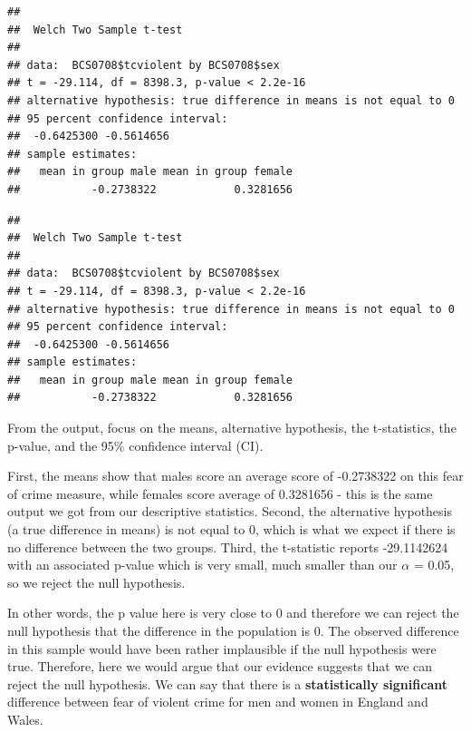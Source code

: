 \documentclass[
]{book}
\newenvironment{Shaded}{\begin{snugshade}}{\end{snugshade}}
\newcommand{\AttributeTok}[1]{\textcolor[rgb]{0.77,0.63,0.00}{#1}}
\newcommand{\CommentTok}[1]{\textcolor[rgb]{0.56,0.35,0.01}{\textit{#1}}}
\newcommand{\ConstantTok}[1]{\textcolor[rgb]{0.00,0.00,0.00}{#1}}
\newcommand{\FunctionTok}[1]{\textcolor[rgb]{0.00,0.00,0.00}{#1}}
\newcommand{\NormalTok}[1]{#1}
\newcommand{\OtherTok}[1]{\textcolor[rgb]{0.56,0.35,0.01}{#1}}
\newcommand{\SpecialCharTok}[1]{\textcolor[rgb]{0.00,0.00,0.00}{#1}}
\begin{document}
\begin{verbatim}
## 
##  Welch Two Sample t-test
## 
## data:  BCS0708$tcviolent by BCS0708$sex
## t = -29.114, df = 8398.3, p-value < 2.2e-16
## alternative hypothesis: true difference in means is not equal to 0
## 95 percent confidence interval:
##  -0.6425300 -0.5614656
## sample estimates:
##   mean in group male mean in group female 
##           -0.2738322            0.3281656
\end{verbatim}

\begin{Shaded}
\end{Shaded}

\begin{verbatim}
## 
##  Welch Two Sample t-test
## 
## data:  BCS0708$tcviolent by BCS0708$sex
## t = -29.114, df = 8398.3, p-value < 2.2e-16
## alternative hypothesis: true difference in means is not equal to 0
## 95 percent confidence interval:
##  -0.6425300 -0.5614656
## sample estimates:
##   mean in group male mean in group female 
##           -0.2738322            0.3281656
\end{verbatim}

From the output, focus on the means, alternative hypothesis, the t-statistics, the p-value, and the 95\% confidence interval (CI).

First, the means show that males score an average score of -0.2738322 on this fear of crime measure, while females score average of 0.3281656 - this is the same output we got from our descriptive statistics. Second, the alternative hypothesis (a true difference in means) is not equal to 0, which is what we expect if there is no difference between the two groups. Third, the t-statistic reports -29.1142624 with an associated p-value which is very small, much smaller than our \(\alpha\) = 0.05, so we reject the null hypothesis.

In other words, the p value here is very close to 0 and therefore we can reject the null hypothesis that the difference in the population is 0. The observed difference in this sample would have been rather implausible if the null hypothesis were true. Therefore, here we would argue that our evidence suggests that we can reject the null hypothesis. We can say that there is a \textbf{statistically significant} difference between fear of violent crime for men and women in England and Wales.
\end{document}
